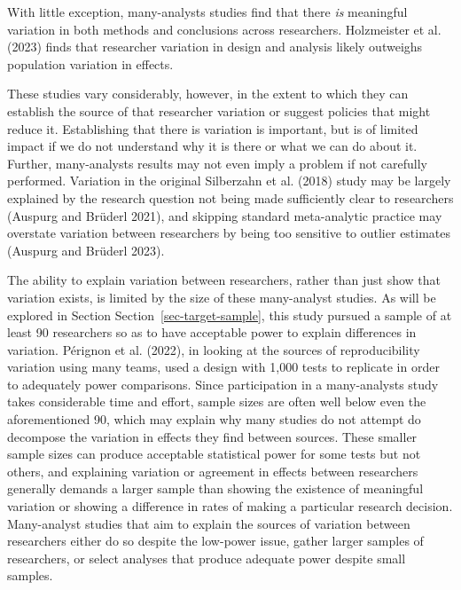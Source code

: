\documentclass[
  letterpaper,
  DIV=11,
  numbers=noendperiod]{scrartcl}
\begin{document}
With little exception, many-analysts studies find that there \emph{is}
meaningful variation in both methods and conclusions across researchers.
Holzmeister et al. (2023) finds that researcher variation in design and
analysis likely outweighs population variation in effects.

These studies vary considerably, however, in the extent to which they
can establish the source of that researcher variation or suggest
policies that might reduce it. Establishing that there is variation is
important, but is of limited impact if we do not understand why it is
there or what we can do about it. Further, many-analysts results may not
even imply a problem if not carefully performed. Variation in the
original Silberzahn et al. (2018) study may be largely explained by the
research question not being made sufficiently clear to researchers
(Auspurg and Brüderl 2021), and skipping standard meta-analytic practice
may overstate variation between researchers by being too sensitive to
outlier estimates (Auspurg and Brüderl 2023).

The ability to explain variation between researchers, rather than just
show that variation exists, is limited by the size of these many-analyst
studies. As will be explored in Section Section~\ref{sec-target-sample},
this study pursued a sample of at least 90 researchers so as to have
acceptable power to explain differences in variation. Pérignon et al.
(2022), in looking at the sources of reproducibility variation using
many teams, used a design with 1,000 tests to replicate in order to
adequately power comparisons. Since participation in a many-analysts
study takes considerable time and effort, sample sizes are often well
below even the aforementioned 90, which may explain why many studies do
not attempt do decompose the variation in effects they find between
sources. These smaller sample sizes can produce acceptable statistical
power for some tests but not others, and explaining variation or
agreement in effects between researchers generally demands a larger
sample than showing the existence of meaningful variation or showing a
difference in rates of making a particular research decision.
Many-analyst studies that aim to explain the sources of variation
between researchers either do so despite the low-power issue, gather
larger samples of researchers, or select analyses that produce adequate
power despite small samples.
\end{document}
